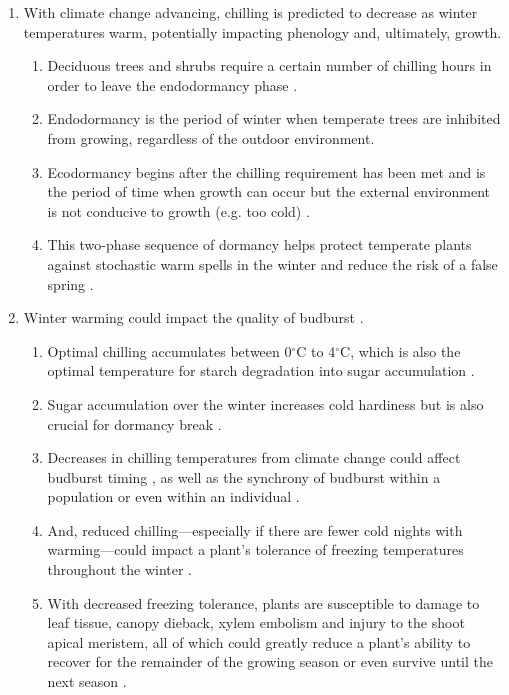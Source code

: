 \documentclass{article}\usepackage[]{graphicx}\usepackage[]{color}
\begin{document}
\begin{enumerate}
\item With climate change advancing, chilling is predicted to decrease as winter temperatures warm, potentially impacting phenology and, ultimately, growth.
  \begin{enumerate}
  \item Deciduous trees and shrubs require a certain number of chilling hours in order to leave the endodormancy phase \citep{Charrier2011}. 
  \item Endodormancy is the period of winter when temperate trees are inhibited from growing, regardless of the outdoor environment. 
  \item Ecodormancy begins after the chilling requirement has been met and is the period of time when growth can occur but the external environment is not conducive to growth (e.g. too cold) \citep{Basler2012}. 
  \item This two-phase sequence of dormancy helps protect temperate plants against stochastic warm spells in the winter and reduce the risk of a false spring \citep{Basler2014}.
  \end{enumerate}

\item Winter warming could impact the quality of budburst \citep{Cleland2007,Bonhomme2010}.
  \begin{enumerate}
  \item Optimal chilling accumulates between 0$^{\circ}$C to 4$^{\circ}$C, which is also the optimal temperature for starch degradation into sugar accumulation \citep{Tixier2019}.
  \item Sugar accumulation over the winter increases cold hardiness but is also crucial for dormancy break \citep{Tixier2017, Tixier2019}.
  \item Decreases in chilling temperatures from climate change could affect budburst timing \citep{Nanninga2017}, as well as the synchrony of budburst within a population or even within an individual \citep{Sanzperez2009}.
  \item And, reduced chilling---especially if there are fewer cold nights with warming---could impact a plant's tolerance of freezing temperatures throughout the winter \citep{Charrier2011}.
  \item With decreased freezing tolerance, plants are susceptible to damage to leaf tissue, canopy dieback, xylem embolism and injury to the shoot apical meristem, all of which could greatly reduce a plant's ability to recover for the remainder of the growing season or even survive until the next season \citep{Sakai1987,Gu2008}.
  \end{enumerate}
  


\end{enumerate}
\end{document}
